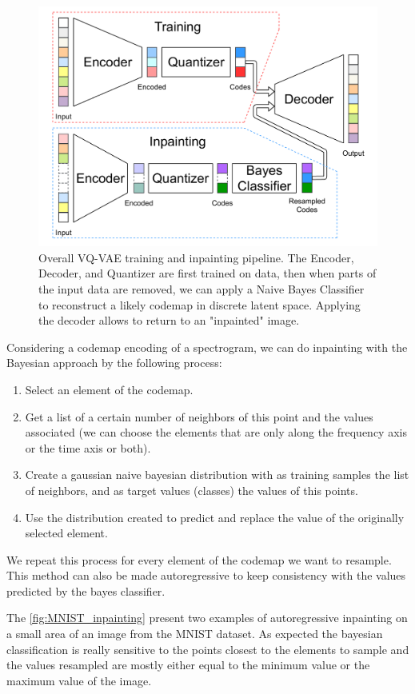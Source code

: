 \documentclass{article}
\begin{document}
\begin{figure}
    \includegraphics[width=\columnwidth]{figs/inpainting.pdf}
    \caption{Overall VQ-VAE training and inpainting pipeline. The Encoder, Decoder, and Quantizer are first trained on data, then when parts of the input data are removed, we can apply a Naive Bayes Classifier to reconstruct a likely codemap in discrete latent space. Applying the decoder allows to return to an "inpainted" image.}
    \label{fig:inpainting}
\end{figure}

Considering a codemap encoding of a spectrogram, we can do inpainting with the Bayesian approach by the following process:
\begin{enumerate}
    \item Select an element of the codemap.
    \item Get a list of a certain number of neighbors of this point and the values associated (we can choose the elements that are only along the frequency axis or the time axis or both).
    \item Create a gaussian naive bayesian distribution with as training samples the list of neighbors, and as target values (classes) the values of this points.
    \item Use the distribution created to predict and replace the value of the originally selected element.
\end{enumerate}
We repeat this process for every element of the codemap we want to resample. This method can also be made autoregressive to keep consistency with the values predicted by the bayes classifier.

The \autoref{fig:MNIST_inpainting} present two examples of autoregressive inpainting on a small area of an image from the MNIST dataset. As expected the bayesian classification is really sensitive to the points closest to the elements to sample and the values resampled are mostly either equal to the minimum value or the maximum value of the image.
\end{document}
